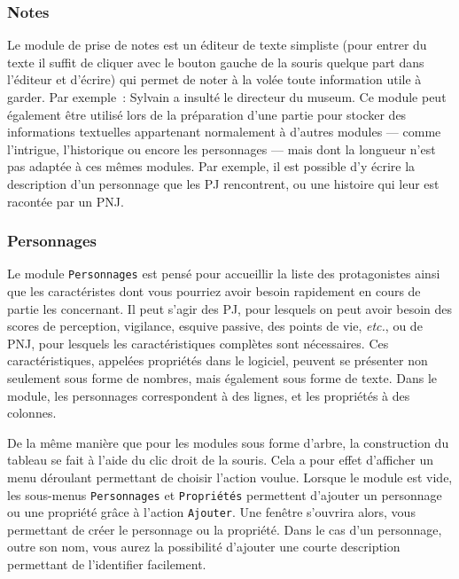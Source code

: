 \documentclass[a4paper,12pt]{article}
\newcommand*{\interfaceitem}[1]{\texttt{#1}}
\newcommand*{\guillemets}[1]{\og #1\fg{}\xspace}
\begin{document}
\subsubsection{Notes}
\label{sec:notes}

Le module de prise de notes est un éditeur de texte simpliste (pour entrer du texte il suffit de cliquer avec le bouton gauche de la souris quelque part dans l'éditeur et d'écrire) qui permet de noter à la volée toute information utile à garder.
Par exemple~: \guillemets{Sylvain a insulté le directeur du museum}.
Ce module peut également être utilisé lors de la préparation d'une partie pour stocker des informations textuelles appartenant normalement à d'autres modules --- comme l'intrigue, l'historique ou encore les personnages --- mais dont la longueur n'est pas adaptée à ces mêmes modules.
Par exemple, il est possible d'y écrire la description d'un personnage que les PJ rencontrent, ou une histoire qui leur est racontée par un PNJ.

\subsubsection{Personnages}
\label{sec:perso}

Le module \interfaceitem{Personnages} est pensé pour accueillir la liste des protagonistes ainsi que les caractéristes dont vous pourriez avoir besoin rapidement en cours de partie les concernant.
Il peut s'agir des PJ, pour lesquels on peut avoir besoin des scores de perception, vigilance, esquive passive, des points de vie, \emph{etc.}, ou de PNJ, pour lesquels les caractéristiques complètes sont nécessaires.
Ces caractéristiques, appelées \guillemets{propriétés} dans le logiciel, peuvent se présenter non seulement sous forme de nombres, mais également sous forme de texte.
Dans le module, les personnages correspondent à des lignes, et les propriétés à des colonnes.

De la même manière que pour les modules sous forme d'arbre, la construction du tableau se fait à l'aide du clic droit de la souris.
Cela a pour effet d'afficher un menu déroulant permettant de choisir l'action voulue.
Lorsque le module est vide, les sous-menus \interfaceitem{Personnages} et \interfaceitem{Propriétés} permettent d'ajouter un personnage ou une propriété grâce à l'action \interfaceitem{Ajouter}.
Une fenêtre s'ouvrira alors, vous permettant de créer le personnage ou la propriété.
Dans le cas d'un personnage, outre son nom, vous aurez la possibilité d'ajouter une courte description permettant de l'identifier facilement.
\end{document}
